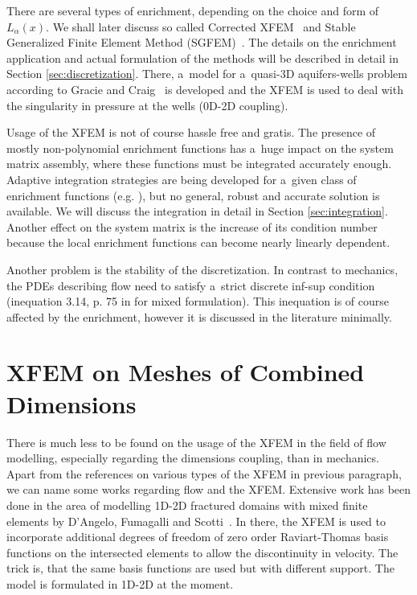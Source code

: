 There are several types of enrichment, depending on the choice and form of $L_{\alpha}(x)$. We shall later
discuss so called Corrected XFEM~\cite{fries_corrected_2008} and Stable Generalized Finite Element Method (SGFEM)~\cite{babuska_stable_2012, gupta_stable_2013}.
The details on the enrichment application and actual formulation of the methods will be described in detail in Section
\ref{sec:discretization}. There, a~model for a~quasi-3D aquifers-wells problem according to Gracie and Craig~\cite{gracie_modelling_2010,craig_using_2011}
is developed and the XFEM is used to deal with the singularity in pressure at the wells (0D-2D coupling).

Usage of the XFEM is not of course hassle free and gratis. The presence of mostly non-polynomial enrichment functions
has a~huge impact on the system matrix assembly, where these functions must be integrated accurately enough.
Adaptive integration strategies are being developed for a~given class of enrichment functions (e.g. \cite{ventura_fast_2009}), 
but no general, robust and accurate solution is available. We will discuss the integration in detail in Section \ref{sec:integration}.
Another effect on the system matrix is the increase of its condition number because the local enrichment functions can
become nearly linearly dependent. 

Another problem is the stability of the discretization. In contrast to mechanics, the PDEs describing flow
need to satisfy a~strict discrete inf-sup condition (inequation 3.14, p. 75 in \cite{brezzi_mixed_1991} for mixed formulation).
This inequation is of course affected by the enrichment, however it is discussed in the literature minimally.


\section{XFEM on Meshes of Combined Dimensions} \label{sec:soa_xfem_combined}
There is much less to be found on the usage of the XFEM in the field of flow modelling, especially regarding the dimensions coupling,
than in mechanics.
Apart from the references on various types of the XFEM in previous paragraph, we can name some works regarding flow and the XFEM.
Extensive work has been done in the area of modelling 1D-2D fractured domains with mixed finite 
elements by D'Angelo, Fumagalli and Scotti~\cite{fumagalli_numerical_2012, dangelo_mixed_2012, fumagalli_efficient_2014}. 
In there, the XFEM is used to incorporate additional degrees of freedom of zero order Raviart-Thomas basis 
functions on the intersected elements to allow the discontinuity in velocity. The trick is, that the same
basis functions are used but with different support. The model is formulated in 1D-2D at the moment.

